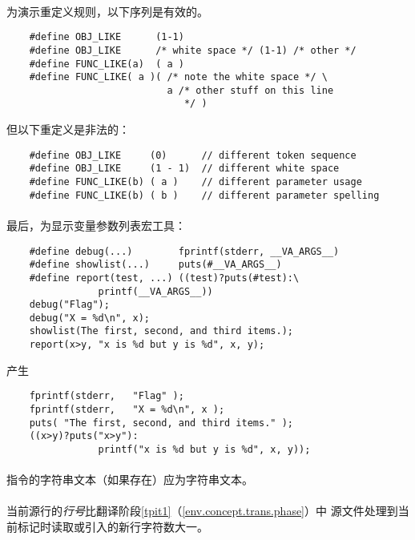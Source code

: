 {\paragraph{}
\ex 为演示重定义规则，以下序列是有效的。
\begin{lstlisting}
    #define OBJ_LIKE      (1-1)
    #define OBJ_LIKE      /* white space */ (1-1) /* other */
    #define FUNC_LIKE(a)  ( a )
    #define FUNC_LIKE( a )( /* note the white space */ \
                            a /* other stuff on this line
                               */ )
\end{lstlisting}
但以下重定义是非法的：
\begin{lstlisting}
    #define OBJ_LIKE     (0)      // different token sequence
    #define OBJ_LIKE     (1 - 1)  // different white space
    #define FUNC_LIKE(b) ( a )    // different parameter usage
    #define FUNC_LIKE(b) ( b )    // different parameter spelling
\end{lstlisting}

\paragraph{}
\ex 最后，为显示变量参数列表宏工具：
\begin{lstlisting}
    #define debug(...)        fprintf(stderr, __VA_ARGS__)
    #define showlist(...)     puts(#__VA_ARGS__)
    #define report(test, ...) ((test)?puts(#test):\
                printf(__VA_ARGS__))
    debug("Flag");
    debug("X = %d\n", x);
    showlist(The first, second, and third items.);
    report(x>y, "x is %d but y is %d", x, y);
\end{lstlisting}
产生
\begin{lstlisting}
    fprintf(stderr,   "Flag" );
    fprintf(stderr,   "X = %d\n", x );
    puts( "The first, second, and third items." );
    ((x>y)?puts("x>y"):
                printf("x is %d but y is %d", x, y));
\end{lstlisting}

\constraint
\paragraph{}
指令的字符串文本（如果存在）应为字符串文本。

\semantic
\paragraph{}
当前源行的\textit{行号}比翻译阶段\ref{tpit1}（\ref{env.concept.trans.phase}）中
源文件处理到当前标记时读取或引入的新行字符数大一。

}

